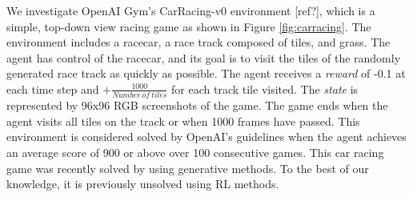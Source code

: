 \documentclass{article}
\begin{document}
We investigate OpenAI Gym’s CarRacing-v0 environment [ref?], which is a simple,
top-down view racing game as shown in Figure \ref{fig:carracing}. The
environment includes a racecar, a race track composed of tiles, and grass. The
agent has control of the racecar, and its goal is to visit the tiles of the
randomly generated race track as quickly as possible. The agent receives
a \textit{reward} of -0.1 at each time step and $+\frac{1000}{Number\ of\
tiles}$ for each track tile visited. The \textit{state} is represented by 96x96
RGB screenshots of the game. The game ends when the agent visits all tiles on
the track or when 1000 frames have passed. This environment is considered
solved by OpenAI's guidelines when the agent achieves an average score of 900
or above over 100 consecutive games. This car racing game was recently solved
by \cite{World_Models} using generative methods. To the best of our knowledge,
it is previously unsolved using RL methods.

\par
\end{document}
